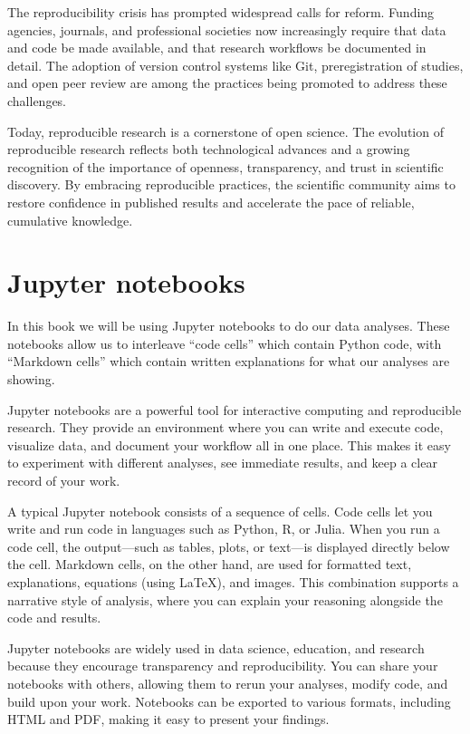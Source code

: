 \documentclass[
  letterpaper,
  DIV=11,
  numbers=noendperiod]{scrreprt}
\begin{document}
The reproducibility crisis has prompted widespread calls for reform.
Funding agencies, journals, and professional societies now increasingly
require that data and code be made available, and that research
workflows be documented in detail. The adoption of version control
systems like Git, preregistration of studies, and open peer review are
among the practices being promoted to address these challenges.

Today, reproducible research is a cornerstone of open science. The
evolution of reproducible research reflects both technological advances
and a growing recognition of the importance of openness, transparency,
and trust in scientific discovery. By embracing reproducible practices,
the scientific community aims to restore confidence in published results
and accelerate the pace of reliable, cumulative knowledge.

\section{Jupyter notebooks}\label{jupyter-notebooks}

In this book we will be using Jupyter notebooks to do our data analyses.
These notebooks allow us to interleave ``code cells'' which contain
Python code, with ``Markdown cells'' which contain written explanations
for what our analyses are showing.

Jupyter notebooks are a powerful tool for interactive computing and
reproducible research. They provide an environment where you can write
and execute code, visualize data, and document your workflow all in one
place. This makes it easy to experiment with different analyses, see
immediate results, and keep a clear record of your work.

A typical Jupyter notebook consists of a sequence of cells. Code cells
let you write and run code in languages such as Python, R, or Julia.
When you run a code cell, the output---such as tables, plots, or
text---is displayed directly below the cell. Markdown cells, on the
other hand, are used for formatted text, explanations, equations (using
LaTeX), and images. This combination supports a narrative style of
analysis, where you can explain your reasoning alongside the code and
results.

Jupyter notebooks are widely used in data science, education, and
research because they encourage transparency and reproducibility. You
can share your notebooks with others, allowing them to rerun your
analyses, modify code, and build upon your work. Notebooks can be
exported to various formats, including HTML and PDF, making it easy to
present your findings.
\end{document}
